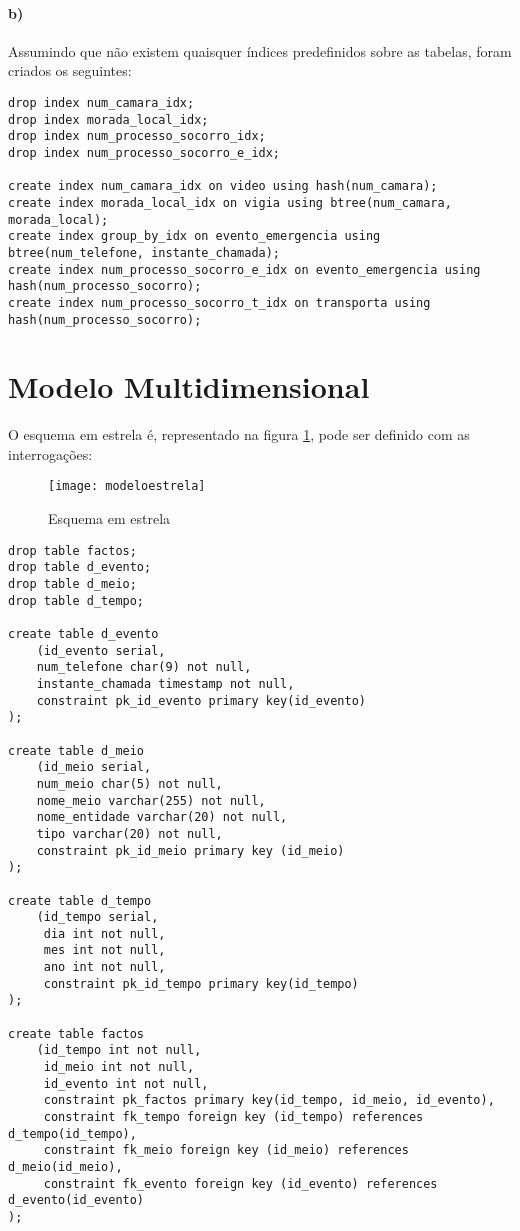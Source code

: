\documentclass[10pt,a4paper]{article}
\begin{document}
\paragraph{b)}
Assumindo que não existem quaisquer índices predefinidos sobre as tabelas, foram criados os seguintes:

\begin{verbatim}
drop index num_camara_idx;
drop index morada_local_idx;
drop index num_processo_socorro_idx;
drop index num_processo_socorro_e_idx;

create index num_camara_idx on video using hash(num_camara);
create index morada_local_idx on vigia using btree(num_camara, morada_local);
create index group_by_idx on evento_emergencia using btree(num_telefone, instante_chamada);
create index num_processo_socorro_e_idx on evento_emergencia using hash(num_processo_socorro);
create index num_processo_socorro_t_idx on transporta using hash(num_processo_socorro);
\end{verbatim}

\section{Modelo Multidimensional}

O esquema em estrela é, representado na figura \ref{f1}, pode ser definido com as interrogações:

\begin{figure}[h]
	\centering
	\texttt{[image: modeloestrela]}
	\caption{Esquema em estrela}
	\label{f1}
\end{figure}

\begin{verbatim}
drop table factos;
drop table d_evento;
drop table d_meio;
drop table d_tempo;

create table d_evento
    (id_evento serial,
    num_telefone char(9) not null,
    instante_chamada timestamp not null,
    constraint pk_id_evento primary key(id_evento)
);

create table d_meio
    (id_meio serial,
    num_meio char(5) not null,
    nome_meio varchar(255) not null,
    nome_entidade varchar(20) not null,
    tipo varchar(20) not null,
    constraint pk_id_meio primary key (id_meio)
);

create table d_tempo
    (id_tempo serial,
     dia int not null,
     mes int not null,
     ano int not null,
     constraint pk_id_tempo primary key(id_tempo)
);

create table factos
    (id_tempo int not null,
     id_meio int not null,
     id_evento int not null,
     constraint pk_factos primary key(id_tempo, id_meio, id_evento),
     constraint fk_tempo foreign key (id_tempo) references d_tempo(id_tempo),
     constraint fk_meio foreign key (id_meio) references d_meio(id_meio),
     constraint fk_evento foreign key (id_evento) references d_evento(id_evento)
);
\end{verbatim}
\end{document}
